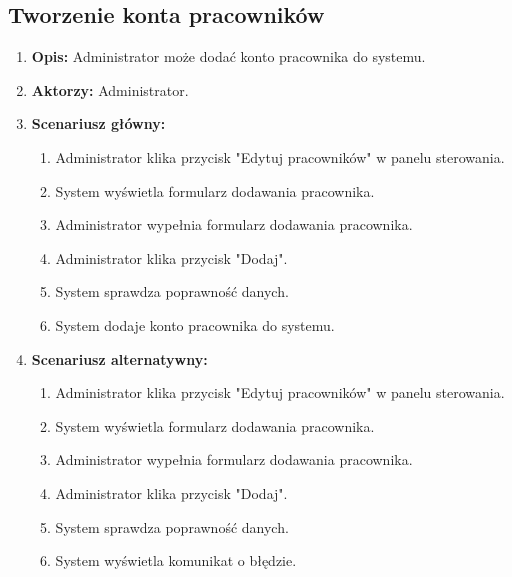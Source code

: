 \subsection{Tworzenie konta pracowników}
\begin{enumerate}
    \item \textbf{Opis:} Administrator może dodać konto pracownika do systemu.
    \item \textbf{Aktorzy:} Administrator.
    \item \textbf{Scenariusz główny:} 
    \begin{enumerate}
        \item Administrator klika przycisk "Edytuj pracowników" w panelu sterowania.
        \item System wyświetla formularz dodawania pracownika.
        \item Administrator wypełnia formularz dodawania pracownika.
        \item Administrator klika przycisk "Dodaj".
        \item System sprawdza poprawność danych.
        \item System dodaje konto pracownika do systemu.
    \end{enumerate}
    \item \textbf{Scenariusz alternatywny:} 
    \begin{enumerate}
        \item Administrator klika przycisk "Edytuj pracowników" w panelu sterowania.
        \item System wyświetla formularz dodawania pracownika.
        \item Administrator wypełnia formularz dodawania pracownika.
        \item Administrator klika przycisk "Dodaj".
        \item System sprawdza poprawność danych.
        \item System wyświetla komunikat o błędzie.
    \end{enumerate}
\end{enumerate}

